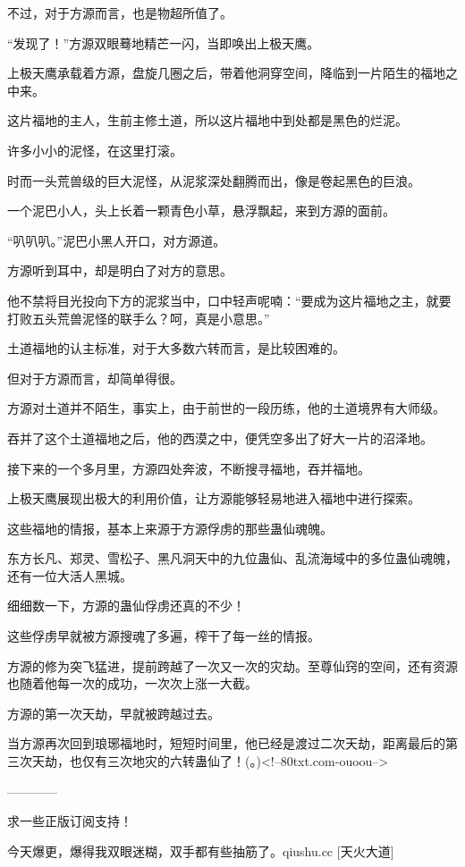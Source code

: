 \begin{this_body}
不过，对于方源而言，也是物超所值了。

“发现了！”方源双眼蓦地精芒一闪，当即唤出上极天鹰。

上极天鹰承载着方源，盘旋几圈之后，带着他洞穿空间，降临到一片陌生的福地之中来。

这片福地的主人，生前主修土道，所以这片福地中到处都是黑色的烂泥。

许多小小的泥怪，在这里打滚。

时而一头荒兽级的巨大泥怪，从泥浆深处翻腾而出，像是卷起黑色的巨浪。

一个泥巴小人，头上长着一颗青色小草，悬浮飘起，来到方源的面前。

“叭叭叭。”泥巴小黑人开口，对方源道。

方源听到耳中，却是明白了对方的意思。

他不禁将目光投向下方的泥浆当中，口中轻声呢喃：“要成为这片福地之主，就要打败五头荒兽泥怪的联手么？呵，真是小意思。”

土道福地的认主标准，对于大多数六转而言，是比较困难的。

但对于方源而言，却简单得很。

方源对土道并不陌生，事实上，由于前世的一段历练，他的土道境界有大师级。

吞并了这个土道福地之后，他的西漠之中，便凭空多出了好大一片的沼泽地。

接下来的一个多月里，方源四处奔波，不断搜寻福地，吞并福地。

上极天鹰展现出极大的利用价值，让方源能够轻易地进入福地中进行探索。

这些福地的情报，基本上来源于方源俘虏的那些蛊仙魂魄。

东方长凡、郑灵、雪松子、黑凡洞天中的九位蛊仙、乱流海域中的多位蛊仙魂魄，还有一位大活人黑城。

细细数一下，方源的蛊仙俘虏还真的不少！

这些俘虏早就被方源搜魂了多遍，榨干了每一丝的情报。

方源的修为突飞猛进，提前跨越了一次又一次的灾劫。至尊仙窍的空间，还有资源也随着他每一次的成功，一次次上涨一大截。

方源的第一次天劫，早就被跨越过去。

当方源再次回到琅琊福地时，短短时间里，他已经是渡过二次天劫，距离最后的第三次天劫，也仅有三次地灾的六转蛊仙了！(。)<!--80txt.com-ouoou-->

------------

求一些正版订阅支持！

今天爆更，爆得我双眼迷糊，双手都有些抽筋了。qiushu.cc [天火大道]


\end{this_body}
